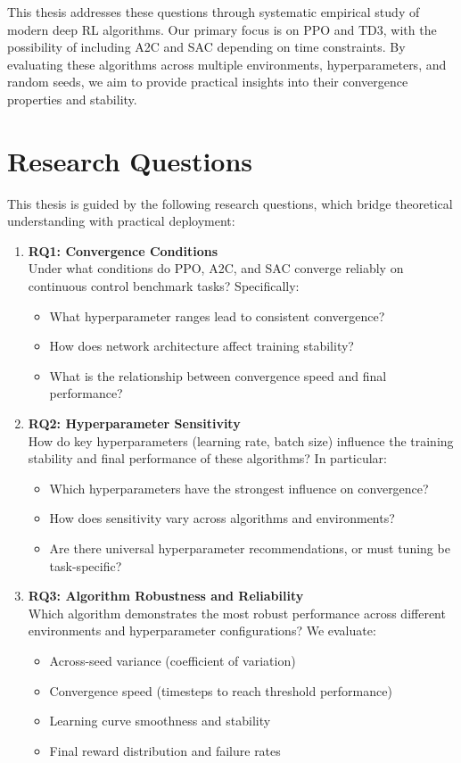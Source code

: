 \documentclass[12pt,a4paper]{report}
\begin{document}
This thesis addresses these questions through systematic empirical study of modern deep RL algorithms. Our primary focus is on PPO and TD3, with the possibility of including A2C and SAC depending on time constraints. By evaluating these algorithms across multiple environments, hyperparameters, and random seeds, we aim to provide practical insights into their convergence properties and stability.

\section{Research Questions}

This thesis is guided by the following research questions, which bridge theoretical understanding with practical deployment:

\begin{enumerate}
    \item \textbf{RQ1: Convergence Conditions}\\
    Under what conditions do PPO, A2C, and SAC converge reliably on continuous control benchmark tasks? Specifically:
    \begin{itemize}
        \item What hyperparameter ranges lead to consistent convergence?
        \item How does network architecture affect training stability?
        \item What is the relationship between convergence speed and final performance?
    \end{itemize}

    \item \textbf{RQ2: Hyperparameter Sensitivity}\\
    How do key hyperparameters (learning rate, batch size) influence the training stability and final performance of these algorithms? In particular:
    \begin{itemize}
        \item Which hyperparameters have the strongest influence on convergence?
        \item How does sensitivity vary across algorithms and environments?
        \item Are there universal hyperparameter recommendations, or must tuning be task-specific?
    \end{itemize}

    \item \textbf{RQ3: Algorithm Robustness and Reliability}\\
    Which algorithm demonstrates the most robust performance across different environments and hyperparameter configurations? We evaluate:
    \begin{itemize}
        \item Across-seed variance (coefficient of variation)
        \item Convergence speed (timesteps to reach threshold performance)
        \item Learning curve smoothness and stability
        \item Final reward distribution and failure rates
    \end{itemize}
\end{enumerate}
\end{document}
